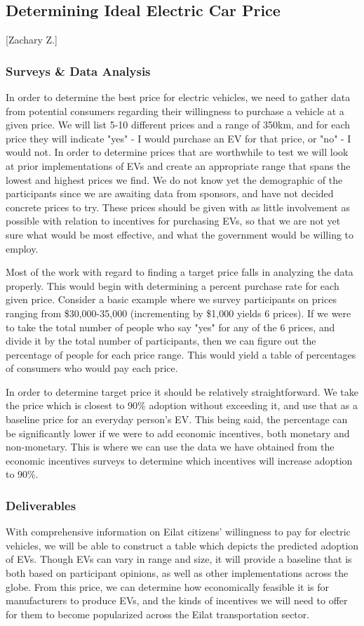 \documentclass[12pt]{article}                         %
\begin{document}
\subsection{Determining Ideal Electric Car Price}[Zachary Z.]

\subsubsection{Surveys \& Data Analysis}
In order to determine the best price for electric vehicles, we need to gather data from potential consumers regarding their willingness to purchase a vehicle at a given price. We will list 5-10 different prices and a range of 350km, and for each price they will indicate "yes" - I would purchase an EV for that price, or "no" - I would not.  In order to determine prices that are worthwhile to test we will look at prior implementations of EVs and create an appropriate range that spans the lowest and highest prices we find. We do not know yet the demographic of the participants since we are awaiting data from sponsors, and have not decided concrete prices to try. These prices should be given with as little involvement as possible with relation to incentives for purchasing EVs, so that we are not yet sure what would be most effective, and what the government would be willing to employ.

Most of the work with regard to finding a target price falls in analyzing the data properly. This would begin with determining a percent purchase rate for each given price. Consider a basic example where we survey participants on prices ranging from \$30,000-35,000 (incrementing by \$1,000 yields 6 prices). If we were to take the total number of people who say "yes" for any of the 6 prices, and divide it by the total number of participants, then we can figure out the percentage of people for each price range. This would yield a table of percentages of consumers who would pay each price.

In order to determine target price it should be relatively straightforward. We take the price which is closest to 90\% adoption without exceeding it, and use that as a baseline price for an everyday person's EV. This being said, the percentage can be significantly lower if we were to add economic incentives, both monetary and non-monetary. This is where we can use the data we have obtained from the economic incentives surveys to determine which incentives will increase adoption to 90\%. 

\subsubsection{Deliverables}
With comprehensive information on Eilat citizens' willingness to pay for electric vehicles, we will be able to construct a table which depicts the predicted adoption of EVs. Though EVs can vary in range and size, it will provide a baseline that is both based on participant opinions, as well as other implementations across the globe. From this price, we can determine how economically feasible it is for manufacturers to produce EVs, and the kinds of incentives we will need to offer for them to become popularized across the Eilat transportation sector.
\end{document}
